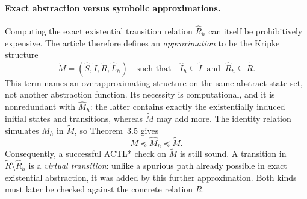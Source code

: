 \paragraph{Exact abstraction versus symbolic approximations.}
Computing the exact existential transition relation \(\widehat R_h\) can itself
be prohibitively expensive.  The article therefore defines an
\emph{approximation} to be the Kripke structure
\[
 \widetilde M=(\widehat S,\widetilde I,\widetilde R,\widehat L_h)
 \quad\text{such that}\quad
 \widehat I_h\subseteq\widetilde I
 \ \text{ and }\
 \widehat R_h\subseteq\widetilde R.
\]
This term names an overapproximating structure on the same abstract state set,
not another abstraction function.  Its necessity is computational, and it is
nonredundant with \(\widehat M_h\): the latter contains exactly the existentially
induced initial states and transitions, whereas \(\widetilde M\) may add more.
The identity relation simulates \(\widehat M_h\) in \(\widetilde M\), so
Theorem~3.5 gives
\[
 M\preceq\widehat M_h\preceq\widetilde M.
\]
Consequently, a successful ACTL* check on \(\widetilde M\) is still sound.
A transition in
\(\widetilde R\setminus\widehat R_h\) is a \emph{virtual transition}: unlike a
spurious path already possible in exact existential abstraction, it was added
by this further approximation.  Both kinds must later be checked against the
concrete relation \(R\).

